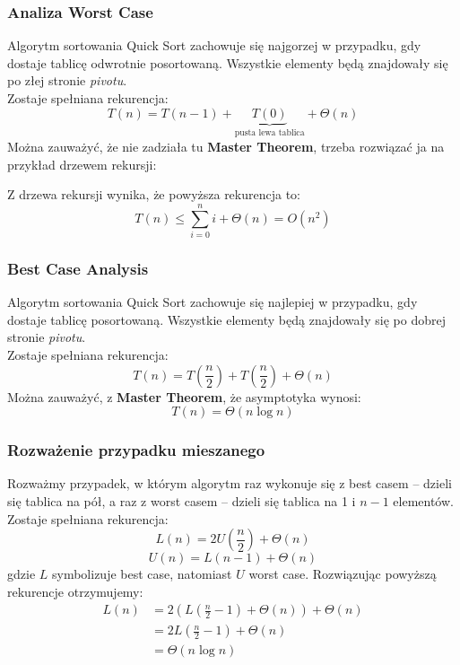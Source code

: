 \documentclass[11pt,a4paper]{article}
\begin{document}
\subsubsection{Analiza Worst Case}
Algorytm sortowania Quick Sort zachowuje się najgorzej w przypadku, gdy dostaje tablicę odwrotnie posortowaną. Wszystkie elementy będą znajdowały się po złej stronie \textit{pivotu}. \\
Zostaje spełniana rekurencja:
\[
    T(n) = T(n-1) + \underbrace{T(0)}_{\text{pusta lewa tablica}} + \Theta(n)
\]
Można zauważyć, że nie zadziała tu \textbf{Master Theorem}, trzeba rozwiązać ja na przykład drzewem rekursji:
\begin{center} %
\end{center}
Z drzewa rekursji wynika, że powyższa rekurencja to:
\[%
    T(n) \leq \sum^{n}_{i=0} i + \Theta(n) = O(n^2)
\]

\subsubsection{Best Case Analysis}
Algorytm sortowania Quick Sort zachowuje się najlepiej w przypadku, gdy dostaje tablicę posortowaną. Wszystkie elementy będą znajdowały się po dobrej stronie \textit{pivotu}. \\
Zostaje spełniana rekurencja:
\[
    T(n) = T(\frac{n}{2}) +T(\frac{n}{2}) +\Theta(n)
\]
Można zauważyć, z \textbf{Master Theorem}, że asymptotyka wynosi:
\[
    T(n) = \Theta(n \log n)
\]

\subsubsection{Rozważenie przypadku mieszanego}
Rozważmy przypadek, w którym algorytm raz wykonuje się z best casem -- dzieli się tablica na pół, a raz z worst casem -- dzieli się tablica na 1 i $n-1$ elementów. \\
Zostaje spełniana rekurencja:
\[
    L(n) = 2U(\frac{n}{2}) + \Theta(n)
\]
\[
    U(n) = L(n-1) + \Theta(n)
\]
gdzie $L$ symbolizuje best case, natomiast $U$ worst case. Rozwiązując powyższą rekurencje otrzymujemy:
\begin{equation*} %
    \begin{aligned}
        L(n)
        &= 2(L(\frac{n}{2} -1) +\Theta(n)) + \Theta(n) \\
        &= 2L(\frac{n}{2} -1) + \Theta(n) \\
        &= \Theta(n \log n)
    \end{aligned}
\end{equation*}
\end{document}
